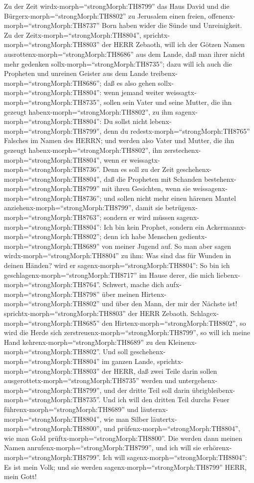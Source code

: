  Zu der Zeit wirdx-morph=``strongMorph:TH8799'' das Haus
David und die Bürgerx-morph=``strongMorph:TH8802'' zu Jerusalem einen
freien, offenenx-morph=``strongMorph:TH8737'' Born haben wider die Sünde
und Unreinigkeit.  Zu der
Zeitx-morph=``strongMorph:TH8804'',
sprichtx-morph=``strongMorph:TH8803'' der HERR Zebaoth, will ich der
Götzen Namen ausrottenx-morph=``strongMorph:TH8686'' aus dem Lande, daß
man ihrer nicht mehr gedenken sollx-morph=``strongMorph:TH8735''; dazu
will ich auch die Propheten und unreinen Geister aus dem Lande
treibenx-morph=``strongMorph:TH8686'';  daß es also gehen
sollx-morph=``strongMorph:TH8804'': wenn jemand weiter
weissagtx-morph=``strongMorph:TH8735'', sollen sein Vater und seine
Mutter, die ihn gezeugt habenx-morph=``strongMorph:TH8802'', zu ihm
sagenx-morph=``strongMorph:TH8804'': Du sollst nicht
lebenx-morph=``strongMorph:TH8799'', denn du
redestx-morph=``strongMorph:TH8765'' Falsches im Namen des HERRN; und
werden also Vater und Mutter, die ihn gezeugt
habenx-morph=``strongMorph:TH8802'', ihn
zerstechenx-morph=``strongMorph:TH8804'', wenn er
weissagtx-morph=``strongMorph:TH8736''.  Denn es soll zu der
Zeit geschehenx-morph=``strongMorph:TH8804'', daß die Propheten mit
Schanden bestehenx-morph=``strongMorph:TH8799'' mit ihren Gesichten,
wenn sie weissagenx-morph=``strongMorph:TH8736''; und sollen nicht mehr
einen härenen Mantel anziehenx-morph=``strongMorph:TH8799'', damit sie
betrügenx-morph=``strongMorph:TH8763'';  sondern er wird
müssen sagenx-morph=``strongMorph:TH8804'': Ich bin kein Prophet,
sondern ein Ackermannx-morph=``strongMorph:TH8802''; denn ich habe
Menschen gedientx-morph=``strongMorph:TH8689'' von meiner Jugend auf.
 So man aber sagen wirdx-morph=``strongMorph:TH8804'' zu
ihm: Was sind das für Wunden in deinen Händen? wird er
sagenx-morph=``strongMorph:TH8804'': So bin ich
geschlagenx-morph=``strongMorph:TH8717'' im Hause derer, die mich
liebenx-morph=``strongMorph:TH8764''.  Schwert, mache dich
aufx-morph=``strongMorph:TH8798'' über meinen
Hirtenx-morph=``strongMorph:TH8802'' und über den Mann, der mir der
Nächste ist! sprichtx-morph=``strongMorph:TH8803'' der HERR Zebaoth.
Schlagex-morph=``strongMorph:TH8685'' den
Hirtenx-morph=``strongMorph:TH8802'', so wird die Herde sich
zerstreuenx-morph=``strongMorph:TH8799'', so will ich meine Hand
kehrenx-morph=``strongMorph:TH8689'' zu den
Kleinenx-morph=``strongMorph:TH8802''.  Und soll
geschehenx-morph=``strongMorph:TH8804'' im ganzen Lande,
sprichtx-morph=``strongMorph:TH8803'' der HERR, daß zwei Teile darin
sollen ausgerottetx-morph=``strongMorph:TH8735'' werden und
untergehenx-morph=``strongMorph:TH8799'', und der dritte Teil soll darin
übrigbleibenx-morph=``strongMorph:TH8735''.  Und ich will
den dritten Teil durchs Feuer führenx-morph=``strongMorph:TH8689'' und
läuternx-morph=``strongMorph:TH8804'', wie man Silber
läutertx-morph=``strongMorph:TH8800'', und
prüfenx-morph=``strongMorph:TH8804'', wie man Gold
prüftx-morph=``strongMorph:TH8800''. Die werden dann meinen Namen
anrufenx-morph=``strongMorph:TH8799'', und ich will sie
erhörenx-morph=``strongMorph:TH8799''. Ich will
sagenx-morph=``strongMorph:TH8804'': Es ist mein Volk; und sie werden
sagenx-morph=``strongMorph:TH8799'' HERR, mein Gott!

